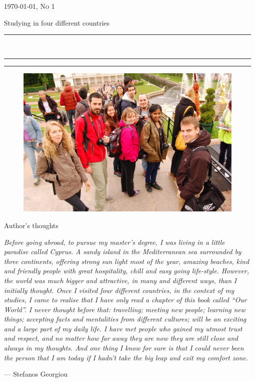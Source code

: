 \documentclass[10pt,a4paper]{article} %
\newcommand{\HorRule}[1]{\noindent\rule{\linewidth}{#1}} %
\newcommand{\SepRule}{\noindent	%
\begin{center}
\rule{250pt}{1pt} %
\end{center}
}
\newcommand{\NewsletterName}[1]{ %
\begin{center}
\Huge \usefont{T1}{fvs}{b}{n} %
#1
\end{center}	
\par \normalsize \normalfont}
\newcommand{\JournalIssue}[1]{ %
\hfill \textsc{\mydate \today, No #1} %
\par \normalsize \normalfont}
\newcommand{\NewsItem}[1]{ %
\usefont{T1}{fvs}{n}{n} %
\vspace{24pt}\large #1\vspace{3pt} %
\par \normalsize \normalfont}
\begin{document}
\JournalIssue{1} %

\NewsletterName{Studying in four different countries} %

\noindent\HorRule{3pt} \\[-0.75\baselineskip] %
\HorRule{1pt} %


\vspace{0.5cm}
\SepRule
\vspace{-0.5cm}

\begin{center}
\begin{minipage}[h]{0.75\linewidth}
\begin{figure}
\includegraphics[width=0.45 \textwidth]{media/front_picture.jpg}
\\
\end{figure}
	
\NewsItem{Author's thoughts} %
\vspace{3pt} %
\textit{
Before going abroad, to pursue my master's degree, I was living in a little
paradise called Cyprus.
A sandy island in the Mediterranean sea surrounded by three continents,
offering strong sun light most of the year, amazing beaches, kind and friendly people 
with great hospitality, chill and easy going life-style. 
However, the world was much bigger and attractive, in many and different ways, than 
I initially thought.
Once I visited four different countries, in the context of my studies, I came to 
realise that I have only read a chapter of this book called ``Our World''. 
I never thought before that: travelling; meeting new people; learning new things; 
accepting facts and mentalities from different cultures; will be an exciting and 
a large part of my daily life. 
I have met people who gained my utmost trust and respect, and no matter how far 
away they are now they are still close and always in my thoughts.   
And one thing I know for sure is that I could never been the person that I am today 
if I hadn't take the big leap and exit my comfort zone.
}
\par\hfill --- Stefanos Georgiou
\end{minipage}
\end{center}
\end{document}
